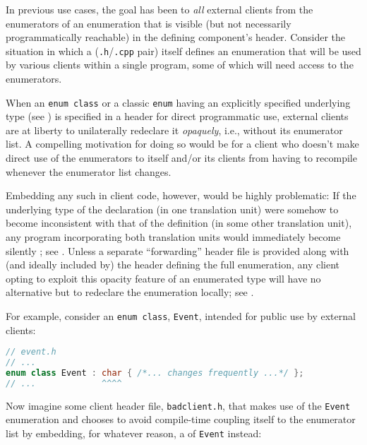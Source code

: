 In previous use cases, the goal has been to  \emph{all}
external clients from the enumerators of an enumeration that is visible
(but not necessarily programmatically reachable) in the defining
component's header. Consider the situation in which a 
(\lstinline!.h!/\lstinline!.cpp! pair) itself defines an enumeration that will
be used by various clients within a single program, some of which will
need access to the enumerators.

When an \lstinline!enum!~\lstinline!class! or a classic \lstinline!enum! having
an explicitly specified underlying type (see ) is specified in
a header for direct programmatic use, external clients are at liberty to
unilaterally redeclare it \emph{opaquely}, i.e., without its enumerator
list. A compelling motivation for doing so would be for a client who
doesn't make direct use of the enumerators to  itself
and/or its clients from having to recompile whenever the enumerator list
changes.

Embedding any such  in client code, however,
would be highly problematic: If the underlying type of the declaration
(in one translation unit) were somehow to become inconsistent with that
of the definition (in some other translation unit), any program
incorporating both translation units would immediately become silently
; see . Unless a separate ``forwarding'' header file is
provided along with (and ideally included by) the header defining the
full enumeration, any client opting to exploit this
opacity feature of an enumerated type will have no alternative but to
redeclare the enumeration locally; see .

For example, consider an \lstinline!enum!~\lstinline!class!, \lstinline!Event!,
intended for public use by external clients:

\begin{lstlisting}[language=C++]
// event.h
// ...
enum class Event : char { /*... changes frequently ...*/ };
// ...             ^^^^
\end{lstlisting}

\noindent Now imagine some client header file, \lstinline!badclient.h!, that makes
use of the \lstinline!Event! enumeration and chooses to avoid compile-time
coupling itself to the enumerator list by
embedding, for whatever reason, a  of \lstinline!Event! instead:

